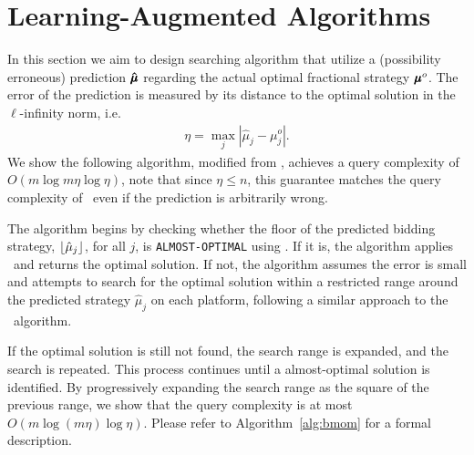 \section{Learning-Augmented Algorithms}
In this section we aim to design searching algorithm that utilize a (possibility erroneous) prediction $\mathbf{\hat{\pmb{\mu}}}$ regarding the actual optimal fractional strategy $\mathbf{\pmb{\mu}}^o$. The error of the prediction is measured by its distance to the optimal solution in the $\ell$-infinity norm, i.e.
\begin{align}\label{eq:errordef}
    \eta = \max_{j}|\hat{\mu}_j - \mu^o_j|.
\end{align}
We show the following algorithm, modified from \mom, achieves a query complexity of $O(m \log m\eta \log\eta)$, note that since $\eta \leq n$, this guarantee matches the query complexity of \mom\ even if the prediction is arbitrarily wrong.

The algorithm begins by checking whether the floor of the predicted bidding strategy, $\lfloor\hat{\mu}_j\rfloor$, for all $j $, is \texttt{ALMOST-OPTIMAL} using \optcheck. If it is, the algorithm applies \roundup\ and returns the optimal solution. If not, the algorithm assumes the error is small and attempts to search for the optimal solution within a restricted range around the predicted strategy $ \hat{\mu}_j$ on each platform, following a similar approach to the \mom\ algorithm. 

If the optimal solution is still not found, the search range is expanded, and the search is repeated. This process continues until a almost-optimal solution is identified. By progressively expanding the search range as the square of the previous range, we show that the query complexity is at most  $O(m \log (m\eta) \log \eta)$. Please refer to Algorithm~\ref{alg:bmom} for a formal description.

